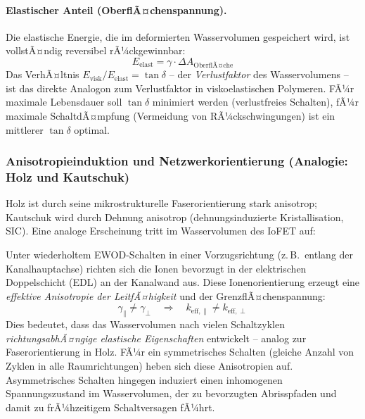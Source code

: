 ﻿\documentclass[a4paper,12pt]{scrreprt}
\theoremstyle{definition}
\begin{document}
\paragraph{Elastischer Anteil (OberflÃ¤chenspannung).}
Die elastische Energie, die im deformierten Wasservolumen gespeichert wird,
ist vollstÃ¤ndig reversibel rÃ¼ckgewinnbar:
\begin{equation}
	E_{\mathrm{elast}} = \gamma \cdot \Delta A_{\mathrm{OberflÃ¤che}}
	\label{eq:elast_energie_wasser}
\end{equation}
Das VerhÃ¤ltnis $E_{\mathrm{visk}} / E_{\mathrm{elast}} = \tan\delta$ -- der
\emph{Verlustfaktor} des Wasservolumens -- ist das direkte Analogon zum
Verlustfaktor in viskoelastischen Polymeren. FÃ¼r maximale Lebensdauer soll
$\tan\delta$ minimiert werden (verlustfreies Schalten), fÃ¼r maximale
SchaltdÃ¤mpfung (Vermeidung von RÃ¼ckschwingungen) ist ein mittlerer
$\tan\delta$ optimal.

\subsubsection{Anisotropieinduktion und Netzwerkorientierung (Analogie: Holz und Kautschuk)}

Holz ist durch seine mikrostrukturelle Faserorientierung stark anisotrop;
Kautschuk wird durch Dehnung anisotrop (dehnungsinduzierte Kristallisation,
SIC). Eine analoge Erscheinung tritt im Wasservolumen des IoFET auf:

Unter wiederholtem EWOD-Schalten in einer Vorzugsrichtung (z.\,B.\ entlang
der Kanalhauptachse) richten sich die Ionen bevorzugt in der elektrischen
Doppelschicht (EDL) an der Kanalwand aus. Diese Ionenorientierung erzeugt
eine \emph{effektive Anisotropie der LeitfÃ¤higkeit} und der GrenzflÃ¤chenspannung:
\begin{equation}
	\gamma_{\parallel} \neq \gamma_{\perp}
	\quad \Rightarrow \quad
	k_{\mathrm{eff},\parallel} \neq k_{\mathrm{eff},\perp}
	\label{eq:anisotropie_wasser}
\end{equation}
Dies bedeutet, dass das Wasservolumen nach vielen Schaltzyklen
\emph{richtungsabhÃ¤ngige elastische Eigenschaften} entwickelt -- analog
zur Faserorientierung in Holz. FÃ¼r ein symmetrisches Schalten (gleiche
Anzahl von Zyklen in alle Raumrichtungen) heben sich diese Anisotropien
auf. Asymmetrisches Schalten hingegen induziert einen inhomogenen
Spannungszustand im Wasservolumen, der zu bevorzugten Abrisspfaden und
damit zu frÃ¼hzeitigem Schaltversagen fÃ¼hrt.
\end{document}
